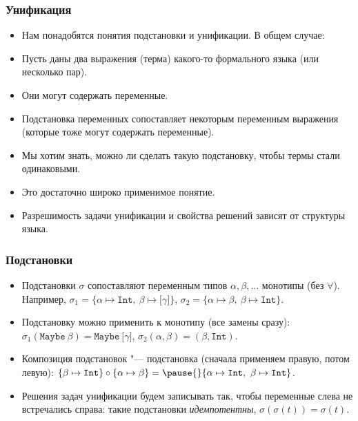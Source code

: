 \documentclass[11pt]{beamer}
\newcommand{\lst}[1]{\mathtt{[}#1\mathtt{]}}
\newcommand{\tInt}{\mathtt{Int}}
\newcommand{\tMaybe}{\mathtt{Maybe}}
\begin{document}
\begin{frame}[fragile]
  \frametitle{Унификация}
  \begin{itemize}
    \item Нам понадобятся понятия подстановки и унификации. В общем случае:
          \pause
    \item Пусть даны два выражения (терма) какого-то формального языка (или несколько пар).
    \item Они могут содержать переменные.
          \pause
    \item Подстановка переменных сопоставляет некоторым переменным выражения (которые тоже могут содержать переменные).
          \pause
    \item Мы хотим знать, можно ли сделать такую подстановку, чтобы термы стали одинаковыми.
          \pause
    \item Это достаточно широко применимое понятие.
          \pause
    \item Разрешимость задачи унификации и свойства решений зависят от структуры языка.
  \end{itemize}
\end{frame}

\begin{frame}[fragile]
  \frametitle{Подстановки}
  \begin{itemize}
    \item Подстановки $\sigma$ сопоставляют переменным типов $\alpha, \beta, \ldots$ монотипы (без $\forall$). Например, $\sigma_1 = \{\alpha \mapsto \tInt,\ \beta \mapsto \lst{\gamma}\}$, $\sigma_2 = \{\alpha \mapsto \beta,\ \beta \mapsto \tInt\}$.
    \item Подстановку можно применить к монотипу (все замены сразу): $\sigma_1(\tMaybe~\beta) = \tMaybe~\lst{\gamma}$, $\sigma_2(\alpha, \beta) = (\beta, \tInt)$.
    \item Композиция подстановок "--- подстановка (сначала применяем правую, потом левую): $\{\beta \mapsto \tInt\} \circ \{\alpha \mapsto \beta\} =\pause{} \{\alpha \mapsto \tInt,\ \beta \mapsto \tInt\}$.
    \item Решения задач унификации будем записывать так, чтобы переменные слева не встречались справа: такие подстановки \emph{идемпотентны}, $\sigma(\sigma(t)) = \sigma(t)$.
  \end{itemize}
\end{frame}
\end{document}
